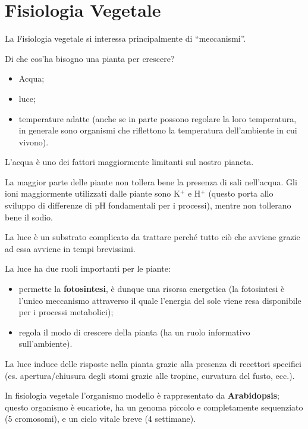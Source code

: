 \documentclass[]{article}
\begin{document}
\section{Fisiologia Vegetale}\label{fisiologia-vegetale}

La Fisiologia vegetale si interessa principalmente di ``meccanismi''.

Di che cos'ha bisogno una pianta per crescere?

\begin{itemize}
\itemsep1pt\parskip0pt
\item
  Acqua;
\item
  luce;
\item
  temperature adatte (anche se in parte possono regolare la loro
  temperatura, in generale sono organismi che riflettono la temperatura
  dell'ambiente in cui vivono).
\end{itemize}

L'acqua è uno dei fattori maggiormente limitanti sul nostro pianeta. 

La maggior parte delle piante non tollera bene la presenza di sali nell'acqua. Gli ioni maggiormente utilizzati dalle piante sono K$^+$ e H$^+$ (questo
porta allo sviluppo di differenze di pH fondamentali per i processi),
mentre non tollerano bene il sodio.

La luce è un substrato complicato da trattare perché tutto ciò che
avviene grazie ad essa avviene in tempi brevissimi.

La luce ha due ruoli importanti per le piante:

\begin{itemize}
\itemsep1pt\parskip0pt
\item
  permette la \textbf{fotosintesi}, è dunque una risorsa energetica (la
  fotosintesi è l'unico meccanismo attraverso il quale l'energia del
  sole viene resa disponibile per i processi metabolici);
\item
  regola il modo di crescere della pianta (ha un ruolo informativo
  sull'ambiente).
\end{itemize}

La luce induce delle risposte nella pianta grazie alla presenza di
recettori specifici (es. apertura/chiusura degli stomi grazie alle
tropine, curvatura del fusto, ecc.).

In fisiologia vegetale l'organismo modello è rappresentato da
\textbf{Arabidopsis}; questo organismo è eucariote, ha un genoma
piccolo e completamente sequenziato (5 cromosomi), e un ciclo vitale
breve (4 settimane).
\end{document}
